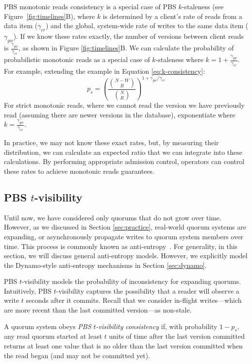 \documentclass{vldb}
\begin{document}
PBS monotonic reads consistency is a special case of PBS $k$-staleness (see
Figure~\ref{fig:timelines}B), where $k$ is determined by a client's
rate of reads from a data item ($\gamma_{cr}$) and the global,
system-wide rate of writes to the same data item ($\gamma_{gw}$).  If
we know these rates exactly, the number of versions between client
reads is $\frac{\gamma_{gw}}{\gamma_{cr}}$, as shown in Figure
\ref{fig:timelines}B.  We can calculate the probability of
probabilistic monotonic reads as a special case of $k$-staleness where
$k=1+\frac{\gamma_{gw}}{\gamma_{cr}}$.  For example, extending the
example in Equation \ref{eq:k-consistency}:
\begin{equation}
\label{eq:prob-mr}
p_{s} = \left(\frac{{N-W \choose R}}{{N \choose R}}\right)^{1+\gamma_{gw}/\gamma_{cr}}
\end{equation}
For strict monotonic reads, where we cannot read the version we have
previously read (assuming there are newer versions in the database),
exponentiate where $k=\frac{\gamma_{gw}}{\gamma_{cr}}$.

In practice, we may not know these exact rates, but, by measuring
their distribution, we can calculate an expected ratio that we can
integrate into these calculations.  By performing appropriate
admission control, operators can control these rates to achieve
monotonic reads guarantees.

\subsection{PBS $t$-visibility}
\label{sec:tvis}

Until now, we have considered only quorums that do not grow over time.
However, as we discussed in Section \ref{sec:practice}, real-world quorum
systems are expanding, or asynchronously propagate writes to quorum system
members over time.  This process is commonly known as
anti-entropy~\cite{antientropy}.  For generality, in this section, we
will discuss general anti-entropy models. However, we explicitly model
the Dynamo-style anti-entropy mechanisms in Section \ref{sec:dynamo}.

PBS $t$-visibility models the probability of inconsistency for
expanding quorums.  Intuitively, PBS $t$-visibility captures the
possibility that a reader will observe a write $t$ seconds after it
commits.  Recall that we consider in-flight writes---which are more
recent than the last committed version---as non-stale.

\begin{definition}
A quorum system obeys \textit{PBS $t$-visibility consistency} if, with
probability $1-p_{s}$, any read quorum started at least $t$ units
of time after the last version committed returns at least one value
that is no older than the last version committed when the read
began (and may not be committed yet).
\end{definition}
\end{document}
